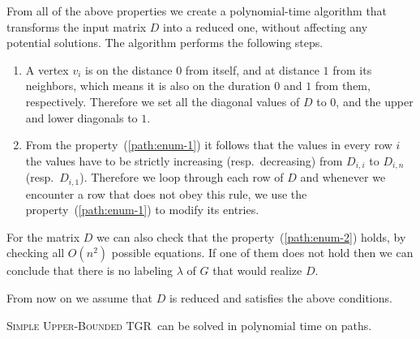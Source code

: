 \documentclass[a4paper,UKenglish,cleveref, autoref, thm-restate]{lipics-v2021}
\newcommand{\deltaUpperBound}{\textsc{Simple Upper-Bounded TGR}}
\begin{document}
From all of the above properties we create a polynomial-time algorithm that transforms the input matrix $D$ into a reduced one, without affecting any potential solutions.
The algorithm performs the following steps.
\begin{enumerate}
    \item A vertex $v_i$ is on the distance $0$ from itself, and at distance $1$ from its neighbors,
    which means it is also on the duration $0$ and $1$ from them, respectively.
    Therefore we set all the diagonal values of $D$ to $0$, and the upper and lower diagonals to $1$.
    \item 
    From the property~(\ref{path:enum-1}) it follows that the values in every row $i$ the values have to be strictly increasing (resp.~decreasing) from $D_{i,i}$ to $D_{i,n}$ (resp.~$D_{i,1}$).
    Therefore we loop through each row of $D$ and whenever we encounter 
    a row that does not obey this rule, we use the property~(\ref{path:enum-1}) to modify its entries.
\end{enumerate}
For the matrix $D$ we can also check that the property~(\ref{path:enum-2}) holds, by checking all $O(n^2)$ possible equations. If one of them does not hold then we can conclude that there is no labeling $\lambda$ of $G$ that would realize $D$.

From now on we assume that $D$ is reduced and satisfies the above conditions.

\begin{theorem}\label{thm:paths-upperBound}
	\deltaUpperBound\ can be solved in polynomial time on paths.
\end{theorem}
\end{document}
